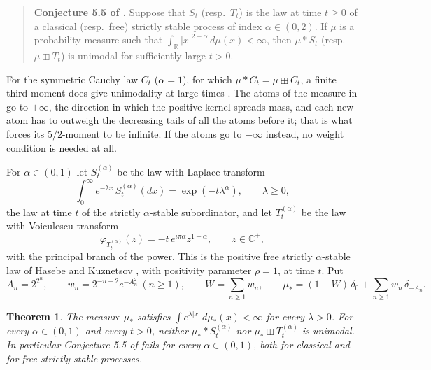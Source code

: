 \documentclass[11pt]{amsart}
\newtheorem{theorem}{Theorem}[section]
\theoremstyle{definition}
\theoremstyle{remark}
\numberwithin{equation}{section}
\newcommand{\R}{\mathbb R}
\newcommand{\C}{\mathbb C}
\newcommand{\bp}{\boxplus}
\begin{document}
\begin{quote}
\textbf{Conjecture 5.5 of \cite{HU}.} Suppose that $S_t$ (resp.\ $T_t$) is the law at time $t\ge0$ of a classical (resp.\ free) strictly stable process of index $\alpha\in(0,2)$. If $\mu$ is a probability measure such that $\int_\R|x|^{2+\alpha}\,d\mu(x)<\infty$, then $\mu*S_t$ (resp.\ $\mu\bp T_t$) is unimodal for sufficiently large $t>0$.
\end{quote}

For the symmetric Cauchy law $C_t$ ($\alpha=1$), for which $\mu*C_t=\mu\bp C_t$, a finite third moment does give unimodality at large times \cite[Theorem 5.2]{HU}. The atoms of the measure in \cite[Proposition 5.4]{HU} go to $+\infty$, the direction in which the positive kernel spreads mass, and each new atom has to outweigh the decreasing tails of all the atoms before it; that is what forces its $5/2$-moment to be infinite. If the atoms go to $-\infty$ instead, no weight condition is needed at all.

For $\alpha\in(0,1)$ let $S^{(\alpha)}_t$ be the law with Laplace transform
\begin{equation}\label{eq:classical}
\int_0^\infty e^{-\lambda x}\,S^{(\alpha)}_t(dx)=\exp(-t\lambda^\alpha),\qquad \lambda\ge0,
\end{equation}
the law at time $t$ of the strictly $\alpha$-stable subordinator, and let $T^{(\alpha)}_t$ be the law with Voiculescu transform
\begin{equation}\label{eq:free}
\varphi_{T^{(\alpha)}_t}(z)=-t\,e^{i\pi\alpha}z^{1-\alpha},\qquad z\in\C^+,
\end{equation}
with the principal branch of the power. This is the positive free strictly $\alpha$-stable law of Hasebe and Kuznetsov \cite{HK}, with positivity parameter $\rho=1$, at time $t$. Put
\begin{equation}\label{eq:mustar}
A_n=2^{2^n},\qquad w_n=2^{-n-2}e^{-A_n^2}\ (n\ge1),\qquad W=\sum_{n\ge1}w_n,\qquad
\mu_\ast=(1-W)\,\delta_0+\sum_{n\ge1}w_n\,\delta_{-A_n}.
\end{equation}

\begin{theorem}\label{thm:main}
The measure $\mu_\ast$ satisfies $\int e^{\lambda|x|}\,d\mu_\ast(x)<\infty$ for every $\lambda>0$. For every $\alpha\in(0,1)$ and every $t>0$, neither $\mu_\ast*S^{(\alpha)}_t$ nor $\mu_\ast\bp T^{(\alpha)}_t$ is unimodal. In particular Conjecture 5.5 of \cite{HU} fails for every $\alpha\in(0,1)$, both for classical and for free strictly stable processes.
\end{theorem}
\end{document}
